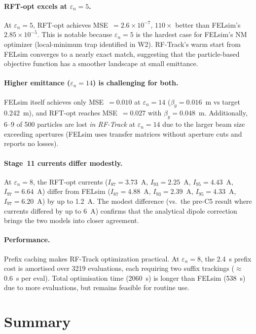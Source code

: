 \documentclass[11pt]{article}
\begin{document}
\paragraph{RFT-opt excels at $\varepsilon_n = 5$.}
At $\varepsilon_n = 5$, RFT-opt achieves MSE~$= 2.6 \times 10^{-7}$,
$110\times$ better than FELsim's $2.85 \times 10^{-5}$.  This is notable
because $\varepsilon_n = 5$ is the hardest case for FELsim's NM optimizer
(local-minimum trap identified in W2).  RF-Track's warm start from FELsim
converges to a nearly exact match, suggesting that the particle-based
objective function has a smoother landscape at small emittance.

\paragraph{Higher emittance ($\varepsilon_n = 14$) is challenging for both.}
FELsim itself achieves only MSE~$= 0.010$ at $\varepsilon_n = 14$
($\beta_y = 0.016$~m vs target 0.242~m), and RFT-opt reaches
MSE~$= 0.027$ with $\beta_y = 0.048$~m.  Additionally, 6--9 of 500
particles are lost \emph{in RF-Track} at $\varepsilon_n = 14$ due to the
larger beam size exceeding apertures (FELsim uses transfer matrices
without aperture cuts and reports no losses).

\paragraph{Stage~11 currents differ modestly.}
At $\varepsilon_n = 8$, the RFT-opt currents ($I_{87} = 3.73$~A,
$I_{93} = 2.25$~A, $I_{95} = 4.43$~A, $I_{97} = 6.64$~A) differ from
FELsim ($I_{87} = 4.88$~A, $I_{93} = 2.39$~A, $I_{95} = 4.33$~A,
$I_{97} = 6.20$~A) by up to 1.2~A.  The modest difference (vs.\ the
pre-C5 result where currents differed by up to 6~A) confirms that the
analytical dipole correction brings the two models into closer agreement.

\paragraph{Performance.}
Prefix caching makes RF-Track optimization practical.  At $\varepsilon_n = 8$,
the \SI{2.4}{s} prefix cost is amortised over 3219 evaluations, each requiring
two suffix trackings ($\approx$\SI{0.6}{s} per eval).  Total optimisation
time (\SI{2060}{s}) is longer than FELsim (\SI{538}{s}) due to more
evaluations, but remains feasible for routine use.


\section{Summary}
\end{document}
